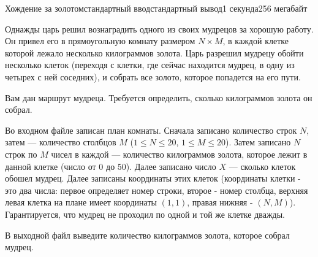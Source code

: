 \begin{problem}{Хождение за золотом}{стандартный ввод}{стандартный вывод}{1 секунда}{256 мегабайт}

Однажды царь решил вознаградить одного из своих мудрецов за хорошую работу. Он привел его в прямоугольную комнату размером $N \times M$, в каждой клетке которой лежало несколько килограммов золота. Царь разрешил мудрецу обойти несколько клеток (переходя с клетки, где сейчас находится мудрец, в одну из четырех с ней соседних), и собрать все золото, которое попадется на его пути.

Вам дан маршрут мудреца. Требуется определить, сколько килограммов золота он собрал.

\InputFile
Во входном файле записан план комнаты. Сначала записано количество строк $N$, затем --- количество столбцов $M$ ($1 \le N \le 20$, $1 \le M \le 20$). Затем записано $N$ строк по $M$ чисел в каждой --- количество килограммов золота, которое лежит в данной клетке (число от 0 до 50). Далее записано число $X$ --- сколько клеток обошел мудрец. Далее записаны координаты этих клеток (координаты клетки - это два числа: первое определяет номер строки, второе - номер столбца, верхняя левая клетка на плане имеет координаты $(1,1)$, правая нижняя - $(N, M)$). Гарантируется, что мудрец не проходил по одной и той же клетке дважды. 

\OutputFile
В выходной файл выведите количество килограммов золота, которое собрал мудрец.

\Example

\begin{example}
%
\end{example}

\end{problem}


